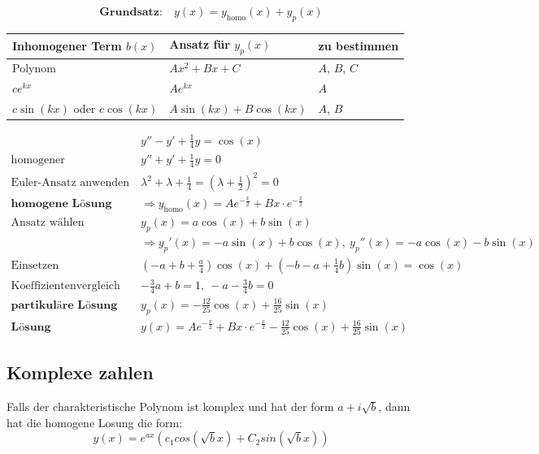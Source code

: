 \documentclass[11pt]{article}
\begin{document}
\begin{equation*}
	\textbf{Grundsatz:}\quad y(x) = y_\text{homo}(x) + y_p(x)
\end{equation*}

\begin{table}[H]
\centering
\begin{tabular}{|l|l|l|}
\hline
\textbf{Inhomogener Term $b(x)$} & \textbf{Ansatz f{\"u}r $y_p(x)$}	& \textbf{zu bestimmen}		\\ \hline
Polynom				& $Ax^2 + Bx + C$			& $A$, $B$, $C$		\\ \hline
$c e^{k x}$ & $Ae^{kx}$					& $A$				\\ \hline
$c\sin(kx)$ oder $c\cos(kx)$ & $A\sin(kx) + B\cos(kx)$ & $A$, $B$ \\ \hline

\end{tabular}
\end{table}

\begin{equation*}
\begin{split}
	& y'' - y' + \frac{1}{4}y = \cos(x) \\
	\text{homogener}\quad & y'' + y' + \frac{1}{4}y = 0 \\
	\text{Euler-Ansatz anwenden}\quad & \lambda^2 + \lambda + \frac{1}{4} = (\lambda + \frac{1}{2})^2 = 0 \\
	\textbf{homogene L{\"o}sung}\quad &\Rightarrow y_\text{homo}(x) = Ae^{-\frac{x}{2}} + Bx \cdot e^{-\frac{x}{2}} \\
	\text{Ansatz w{\"a}hlen}\quad & y_p(x) = a\cos(x) + b\sin(x) \\
							  & \Rightarrow y_p'(x) = -a\sin(x) + b\cos(x),\  y_p''(x) = -a\cos(x) -b \sin(x) \\
	\text{Einsetzen}\quad & (-a + b + \frac{a}{4})\cos(x) + (-b -a + \frac{1}{4}b)\sin(x) = \cos(x) \\
	\text{Koeffizientenvergleich}\quad & -\frac{3}{4}a + b = 1,\ -a-\frac{3}{4}b = 0 \\
	\textbf{partikul{\"a}re L{\"o}sung}\quad & y_p(x) = -\frac{12}{25}\cos(x) + \frac{16}{25}\sin(x) \\
	\textbf{L{\"o}sung}\quad & y(x) = Ae^{-\frac{x}{2}} + Bx \cdot e^{-\frac{x}{2}} -\frac{12}{25}\cos(x) + \frac{16}{25}\sin(x)
\end{split}
\end{equation*}
\subsection{Komplexe zahlen}
Falls der charakteristische Polynom ist komplex und hat der form $a + i\sqrt{b}$, dann hat die homogene Losung die form:
\begin{equation*}
	y(x)=e^{ax}(c_1cos(\sqrt{b}x) + C_2sin(\sqrt{b}x))
\end{equation*}
\end{document}
